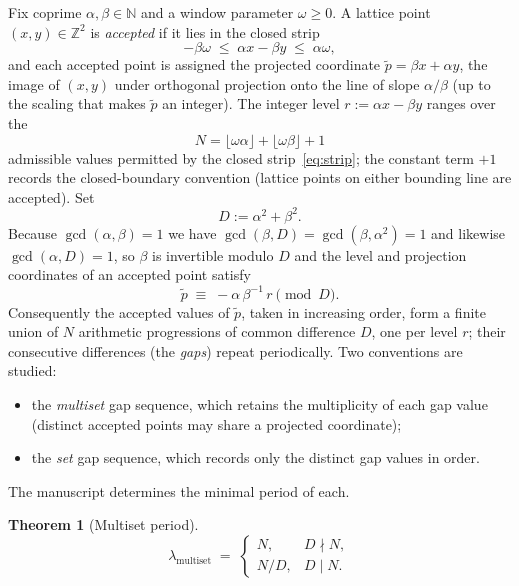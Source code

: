 \documentclass[11pt]{article}
\theoremstyle{plain}
\newtheorem{theorem}{Theorem}
\theoremstyle{remark}
\newcommand{\Z}{\mathbb{Z}}
\newcommand{\N}{\mathbb{N}}
\newcommand{\pt}{\tilde{p}}
\newcommand{\lmult}{\lambda_{\mathrm{multiset}}}
\begin{document}
Fix coprime $\alpha,\beta\in\N$ and a window parameter $\omega\ge 0$. A lattice
point $(x,y)\in\Z^2$ is \emph{accepted} if it lies in the closed strip
\begin{equation}\label{eq:strip}
  -\beta\omega \;\le\; \alpha x-\beta y \;\le\; \alpha\omega ,
\end{equation}
and each accepted point is assigned the projected coordinate
$\pt=\beta x+\alpha y$, the image of $(x,y)$ under orthogonal projection onto the
line of slope $\alpha/\beta$ (up to the scaling that makes $\pt$ an integer). The
integer level $r:=\alpha x-\beta y$ ranges over the
\begin{equation}\label{eq:N}
  N=\lfloor\omega\alpha\rfloor+\lfloor\omega\beta\rfloor+1
\end{equation}
admissible values permitted by the closed strip~\eqref{eq:strip}; the constant term
$+1$ records the closed-boundary convention (lattice points on either bounding line
are accepted). Set
\begin{equation}\label{eq:D}
  D:=\alpha^2+\beta^2 .
\end{equation}
Because $\gcd(\alpha,\beta)=1$ we have $\gcd(\beta,D)=\gcd(\beta,\alpha^2)=1$ and
likewise $\gcd(\alpha,D)=1$, so $\beta$ is invertible modulo $D$ and the level and
projection coordinates of an accepted point satisfy
\begin{equation}\label{eq:residue}
  \pt \;\equiv\; -\alpha\,\beta^{-1}\,r \pmod{D}.
\end{equation}
Consequently the accepted values of $\pt$, taken in increasing order, form a
finite union of $N$ arithmetic progressions of common difference $D$, one per level
$r$; their consecutive differences (the \emph{gaps}) repeat periodically. Two
conventions are studied:
\begin{itemize}[leftmargin=1.8em,itemsep=2pt]
  \item the \emph{multiset} gap sequence, which retains the multiplicity of each gap
        value (distinct accepted points may share a projected coordinate);
  \item the \emph{set} gap sequence, which records only the distinct gap values in
        order.
\end{itemize}
The manuscript determines the minimal period of each.

\begin{theorem}[Multiset period]\label{thm:multiset}
\[
  \lmult \;=\;
  \begin{cases} N, & D\nmid N,\\[2pt] N/D, & D\mid N. \end{cases}
\]
\end{theorem}
\end{document}

